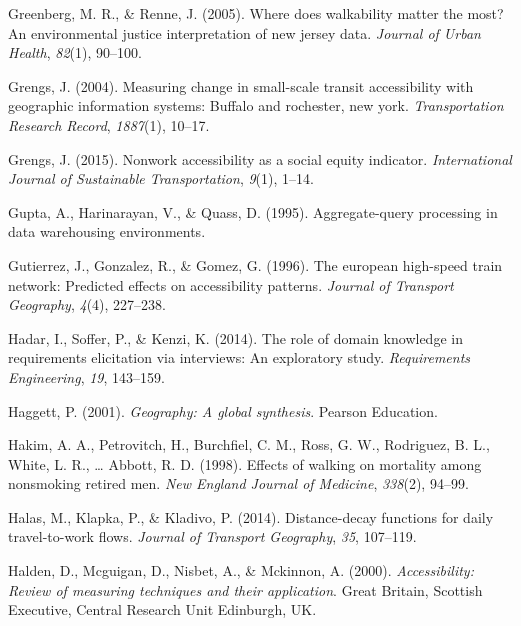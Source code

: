 \documentclass[12pt,twoside]{reedthesis}
\newlength{\cslhangindent}
\newenvironment{CSLReferences}[2] %
 {%
  \setlength{\parindent}{0pt}
  \ifodd #1 \everypar{\setlength{\hangindent}{\cslhangindent}}\ignorespaces\fi
  \ifnum #2 > 0
  \setlength{\parskip}{#2\baselineskip}
  \fi
 }%
 {}
\begin{document}
\begin{CSLReferences}{1}{0}
\leavevmode{}%
Greenberg, M. R., \& Renne, J. (2005). Where does walkability matter the most? An environmental justice interpretation of new jersey data. \emph{Journal of Urban Health}, \emph{82}(1), 90--100.

\leavevmode{}%
Grengs, J. (2004). Measuring change in small-scale transit accessibility with geographic information systems: Buffalo and rochester, new york. \emph{Transportation Research Record}, \emph{1887}(1), 10--17.

\leavevmode{}%
Grengs, J. (2015). Nonwork accessibility as a social equity indicator. \emph{International Journal of Sustainable Transportation}, \emph{9}(1), 1--14.

\leavevmode{}%
Gupta, A., Harinarayan, V., \& Quass, D. (1995). Aggregate-query processing in data warehousing environments.

\leavevmode{}%
Gutierrez, J., Gonzalez, R., \& Gomez, G. (1996). The european high-speed train network: Predicted effects on accessibility patterns. \emph{Journal of Transport Geography}, \emph{4}(4), 227--238.

\leavevmode{}%
Hadar, I., Soffer, P., \& Kenzi, K. (2014). The role of domain knowledge in requirements elicitation via interviews: An exploratory study. \emph{Requirements Engineering}, \emph{19}, 143--159.

\leavevmode{}%
Haggett, P. (2001). \emph{Geography: A global synthesis}. Pearson Education.

\leavevmode{}%
Hakim, A. A., Petrovitch, H., Burchfiel, C. M., Ross, G. W., Rodriguez, B. L., White, L. R., \ldots{} Abbott, R. D. (1998). Effects of walking on mortality among nonsmoking retired men. \emph{New England Journal of Medicine}, \emph{338}(2), 94--99.

\leavevmode{}%
Halas, M., Klapka, P., \& Kladivo, P. (2014). Distance-decay functions for daily travel-to-work flows. \emph{Journal of Transport Geography}, \emph{35}, 107--119.

\leavevmode{}%
Halden, D., Mcguigan, D., Nisbet, A., \& Mckinnon, A. (2000). \emph{Accessibility: Review of measuring techniques and their application}. Great Britain, Scottish Executive, Central Research Unit Edinburgh, UK.


\end{CSLReferences}
\end{document}
